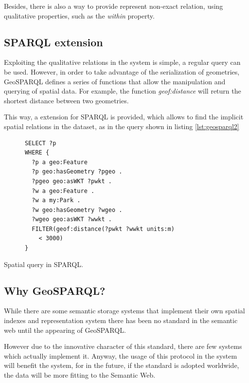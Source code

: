 Besides, there is also a way to provide represent non-exact relation, using qualitative properties, such as the \textit{within} property.

\subsection*{SPARQL extension}

Exploiting the qualitative relations in the system is simple, a regular query can be used. However, in order to take advantage of the serialization of geometries, GeoSPARQL defines a series of functions that allow the manipulation and querying of spatial data. For example, the function \textit{geof:distance} will return the shortest distance between two geometries.

This way, a extension for SPARQL is provided, which allows to find the implicit spatial relations in the dataset, as in the query shown in listing \ref{lst:geosparql2}

\begin{listing}\centering
  \begin{minipage}{.6\textwidth}
    \begin{verbatim}
      SELECT ?p
      WHERE {
        ?p a geo:Feature
        ?p geo:hasGeometry ?pgeo .
        ?pgeo geo:asWKT ?pwkt .
        ?w a geo:Feature .
        ?w a my:Park .
        ?w geo:hasGeometry ?wgeo .
        ?wgeo geo:asWKT ?wwkt .
        FILTER(geof:distance(?pwkt ?wwkt units:m)
          < 3000)
      }
    \end{verbatim}
  \end{minipage}
  \caption{Spatial query in SPARQL.}\label{lst:geosparql2}
\end{listing}

\subsection*{Why GeoSPARQL?}

While there are some semantic storage systems that implement their own spatial indexes and representation system there has been no standard in the semantic web until the appearing of GeoSPARQL. 

However due to the innovative character of this standard, there are few systems which actually implement it. Anyway, the usage of this protocol in the system will benefit the system, for in the future, if the standard is adopted worldwide, the data will be more fitting to the Semantic Web.

